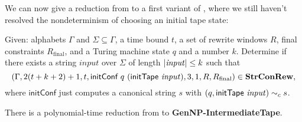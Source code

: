 \documentclass[a4paper,UKenglish,cleveref, autoref]{lipics-v2019}
\newcommand{\TODO}[1]{\ifthenelse{\isundefined{\showTODOs}}{}{\colorbox{red}{\LARGE TODO}:#1}}
\newcommand{\Rfinal}{R_{\text{final}}}
\begin{document}
We can now give a reduction from \gennp{} to a first variant of \strconrew{}, where we still haven't resolved the nondeterminism of choosing an initial tape state:
\begin{definition}
  Given: alphabets $\Gamma$ and $\Sigma \subseteq \Gamma$, a time bound $t$, a set of rewrite windows $R$, final constraints $\Rfinal$, and a Turing machine state $q$ and a number $k$. 
  Determine if there exists a string $\mathit{input}$ over $\Sigma$ of length $|\mathit{input}| \le k$ such that 
  \[(\Gamma, 2 (t + k + 2) + 1, t, \textsf{initConf}~q~(\textsf{initTape}~\mathit{input}), 3, 1, R, \Rfinal) \in \strconrew{},\]
  where $\textsf{initConf}$ just computes a canonical string $s$ with $(q, \textsf{initTape}~\mathit{input}) \sim_c{} s$. 
\end{definition}
\begin{theorem}
  There is a polynomial-time reduction from \gennp{} to \textbf{GenNP-IntermediateTape}. 
\end{theorem}
\end{document}
